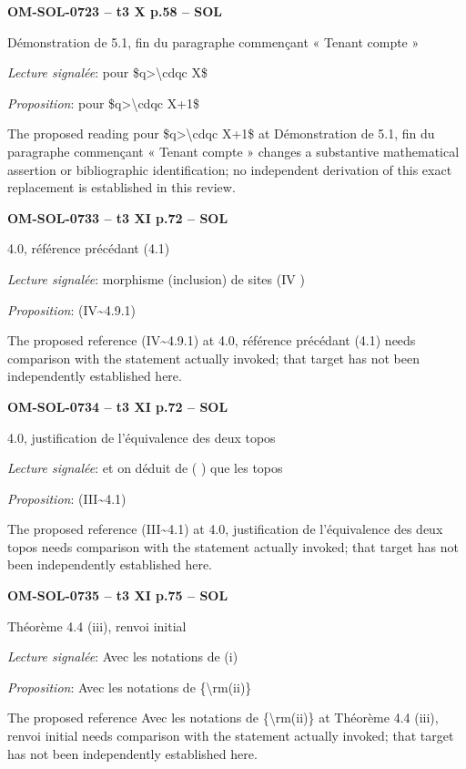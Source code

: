 \par\noindent\textbf{OM-SOL-0723 -- t3 X p.58 -- SOL}\par
Démonstration de 5.1, fin du paragraphe commençant « Tenant compte »\par
\emph{Lecture signalée}: pour \$q>\textbackslash{}cdqc X\$\par
\emph{Proposition}: pour \$q>\textbackslash{}cdqc X+1\$\par
The proposed reading pour \$q>\textbackslash{}cdqc X+1\$ at Démonstration de 5.1, fin du paragraphe commençant « Tenant compte » changes a substantive mathematical assertion or bibliographic identification; no independent derivation of this exact replacement is established in this review.\par
\par\noindent\textbf{OM-SOL-0733 -- t3 XI p.72 -- SOL}\par
4.0, référence précédant (4.1)\par
\emph{Lecture signalée}: morphisme (inclusion) de sites (IV )\par
\emph{Proposition}: (IV\textasciitilde{}4.9.1)\par
The proposed reference (IV\textasciitilde{}4.9.1) at 4.0, référence précédant (4.1) needs comparison with the statement actually invoked; that target has not been independently established here.\par
\par\noindent\textbf{OM-SOL-0734 -- t3 XI p.72 -- SOL}\par
4.0, justification de l'équivalence des deux topos\par
\emph{Lecture signalée}: et on déduit de ( ) que les topos\par
\emph{Proposition}: (III\textasciitilde{}4.1)\par
The proposed reference (III\textasciitilde{}4.1) at 4.0, justification de l'équivalence des deux topos needs comparison with the statement actually invoked; that target has not been independently established here.\par
\par\noindent\textbf{OM-SOL-0735 -- t3 XI p.75 -- SOL}\par
Théorème 4.4 (iii), renvoi initial\par
\emph{Lecture signalée}: Avec les notations de (i)\par
\emph{Proposition}: Avec les notations de \{\textbackslash{}rm(ii)\}\par
The proposed reference Avec les notations de \{\textbackslash{}rm(ii)\} at Théorème 4.4 (iii), renvoi initial needs comparison with the statement actually invoked; that target has not been independently established here.\par
